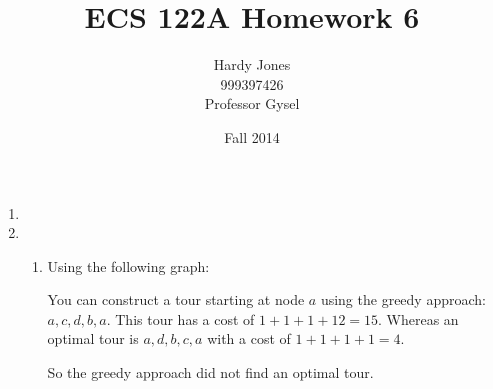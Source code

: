 \documentclass[12pt,letterpaper]{article}
\title{ECS 122A Homework 6\vspace{-2ex}}
\author{Hardy Jones\\
        999397426\\
        Professor Gysel\vspace{-2ex}}
\date{Fall 2014}
\begin{document}
  \maketitle

  \begin{enumerate}
    \item

    \item
      \begin{enumerate}
        \item
          Using the following graph:


          You can construct a tour starting at node $a$ using the greedy approach: $a, c, d, b, a$.
          This tour has a cost of $1 + 1 + 1 + 12 = 15$.
          Whereas an optimal tour is $a, d, b, c, a$ with a cost of $1 + 1 + 1 + 1 = 4$.

          So the greedy approach did not find an optimal tour.


\end{enumerate}
\end{enumerate}
\end{document}
